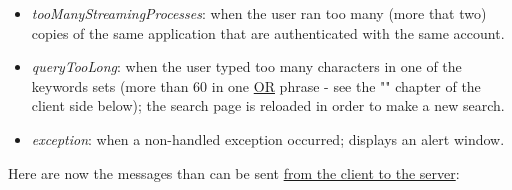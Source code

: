 \documentclass[a4paper,11pt]{report}
\begin{document}
\begin{itemize}
\begin{itemize}
	\item \emph{tooManyStreamingProcesses}: when the user ran too many (more that two) copies of the same application that are authenticated with the same account.
	\item \emph{queryTooLong}: when the user typed too many characters in one of the keywords sets (more than 60 in one \underline{OR} phrase - see the "" chapter of the client side below); the search page is reloaded in order to make a new search.
	\item \emph{exception}: when a non-handled exception occurred; displays an alert window.
	\end{itemize}
\end{itemize}
\bigskip

Here are now the messages than can be sent \underline{from the client to the server}: 
\end{document}

